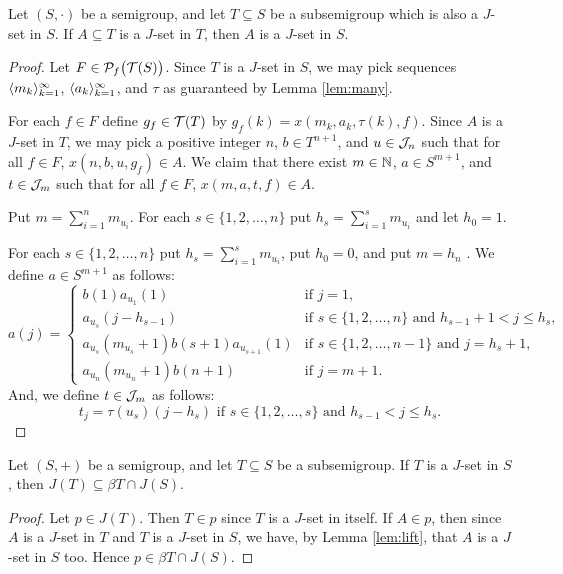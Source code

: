 \begin{lem}
  \label{lem:lift}
  Let $(S, \cdot)$ be a semigroup, and let $T \subseteq S$ be a subsemigroup which is also a $J$-set in $S$.
  If $A \subseteq T$ is a $J$-set in $T$, then $A$ is a $J$-set in $S$.
\end{lem}
\begin{proof}
  Let $F \in \mathcal{P}_f\bigl( \mathcal{T}(S) \bigr)$.
  Since $T$ is a $J$-set in $S$, we may pick sequences $\langle m_k \rangle_{k=1}^\infty$, $\langle a_k \rangle_{k=1}^\infty$, and $\tau$ as guaranteed by Lemma \ref{lem:many}.

  For each $f \in F$ define $g_f \in \mathcal{T}(T)$ by $g_f(k) = x(m_k, a_k, \tau(k), f)$. 
  Since $A$ is a $J$-set in $T$, we may pick a positive integer $n$, $b \in T^{n+1}$, and $u \in \mathcal{J}_n$ such that for all $f \in F$, $x(n, b, u, g_f) \in A$.
  We claim that there exist $m \in \mathbb{N}$, $a \in S^{m+1}$, and $t \in \mathcal{J}_m$ such that for all $f \in F$, $x(m, a, t, f) \in A$.

  Put $m = \sum_{i=1}^n m_{u_i}$. 
  For each $s \in \{1, 2, \ldots, n\}$ put $h_s = \sum_{i=1}^s m_{u_i}$ and let $h_0 = 1$. 

  For each $s \in \{1, 2, \ldots, n\}$ put $h_s = \sum_{i=1}^s m_{u_i}$, put $h_0 = 0$, and put $m = h_n$ .
  We define $a \in S^{m+1}$ as follows:
  \[
    a(j) =
    \begin{cases}
      b(1)a_{u_1}(1) & \mbox{if $j=1$,} \\
      a_{u_s}(j-h_{s-1}) & \mbox{if $s \in \{1, 2, \ldots, n\}$ and $h_{s-1} + 1 < j \le h_s$,} \\
      a_{u_s}(m_{u_s}+1)b(s+1)a_{u_{s+1}}(1) & \mbox{if $s \in \{1, 2, \ldots, n-1\}$ and $j = h_s + 1$,} \\
      a_{u_n}(m_{u_n}+1)b(n+1) & \mbox{if $j = m+1$.}
    \end{cases}
  \]
  And, we define $t \in \mathcal{J}_m$ as follows:
  \[
    t_j = 
      \mbox{$\tau(u_s)(j- h_s)$ if $s \in \{1, 2, \ldots, s\}$ and $h_{s-1} < j \le h_s$.}
  \]
\end{proof}

\begin{thm}
  \label{thm:comb-ideal}
  Let $(S, +)$ be a semigroup, and let $T \subseteq S$ be a subsemigroup.
  If $T$ is a $J$-set in $S$, then $J(T) \subseteq \beta T \cap J(S)$.
\end{thm}
\begin{proof}
  Let $p \in J(T)$.
  Then $T \in p$ since $T$ is a $J$-set in itself.
  If $A \in p$, then since $A$ is a $J$-set in $T$ and $T$ is a $J$-set in $S$, we have, by Lemma \ref{lem:lift}, that $A$ is a $J$-set in $S$ too.
  Hence $p \in \beta T \cap J(S)$. 
\end{proof}

